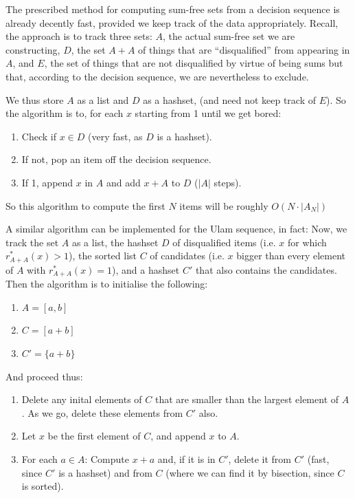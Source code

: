 \documentclass{article}
\theoremstyle{definition}
\theoremstyle{remark}
\numberwithin{equation}{section}
\begin{document}
{The prescribed method for computing sum-free sets from a decision
sequence is already decently fast, provided we keep track of the data
appropriately.  Recall, the approach is to track three sets: $A$, the
actual sum-free set we are constructing, $D$, the set $A+A$ of things
that are ``disqualified'' from appearing in $A$, and $E$, the set of
things that are not disqualified by virtue of being sums but that,
according to the decision sequence, we are nevertheless to exclude.

We thus store $A$ as a list and $D$ as a hashset, (and need not keep
track of $E$).  So the algorithm is to, for each $x$ starting from 1
until we get bored:

\begin{enumerate}
\item Check if $x \in D$ (very fast, as $D$ is a hashset).  
\item If not, pop an item off the decision sequence.  
\item If 1, append $x$ in $A$ and add $x + A$ to $D$ ($|A|$ steps).
\end{enumerate}

So this algorithm to compute the first $N$ items will be roughly
$O(N \cdot |A_N|)$

A similar algorithm can be implemented for the Ulam sequence, in fact:
Now, we track the set $A$ as a list, the hashset $D$ of disqualified
items (i.e. $x$ for which $r^*_{A+A}(x) > 1$), the sorted list $C$ of
candidates (i.e. $x$ bigger than every element of $A$ with
$r^*_{A+A}(x) = 1$), and a hashset $C'$ that also contains the candidates.  Then the algorithm is to initialise the
following: 

\begin{enumerate}
\item $A = [a,b]$
\item $C = [a+b]$
\item $C' = \{a+b\}$
\end{enumerate}

And proceed thus: 

\begin{enumerate}
\item Delete any inital elements of $C$ that are smaller than the
  largest element of $A$.  As we go, delete these elements from $C'$
  also.
\item Let $x$ be the first element of $C$, and append $x$ to $A$.
\item For each $a \in A$: Compute $x + a$ and, if it is in $C'$,
  delete it from $C'$ (fast, since $C'$ is a hashset) and from $C$
  (where we can find it by bisection, since $C$ is sorted).
\end{enumerate}

}
\end{document}
